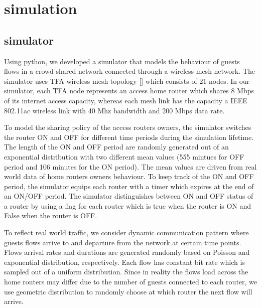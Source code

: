 \section{simulation}
\label{sec:simulation}

\subsection{simulator}
Using python, we developed a simulator that models the behaviour of guests flows in a crowd-shared network connected through a wireless mesh network. The simulator uses TFA wireless mesh topology [] which consists of 21 nodes. In our simulator, each TFA node represents an access home router which shares 8 Mbps of its internet access capacity, whereas each mesh link has the capacity a IEEE 802.11ac wireless link with 40 Mhz bandwidth and 200 Mbps data rate. 

To model the sharing policy of the access routers owners, the simulator switches the router ON and OFF for different time periods during the simulation lifetime. The length of the ON and OFF period are randomly generated out of an exponential distribution with two different mean values (555 mintues for OFF period and 106 minutes for the ON period). The mean values are driven from real world data of home routers owners behaviour. To keep track of the ON and OFF period, the simulator equips each router with a timer which expires at the end of an ON/OFF period. The simulator distinguishes between ON and OFF status of a router by using a flag for each router which is true when the router is ON and False when the router is OFF. 

To reflect real world traffic, we consider dynamic communication pattern where guests flows arrive to and departure from the network at certain time points. Flows arrival rates and durations are generated randomly based on Poisson and exponential distribution, respectively. Each flow has constant bit rate which is sampled out of a uniform distribution. Since in reality the flows load across the home routers may differ due to the number of guests connected to each router, we use geometric distribution to randomly choose at which router the next flow will arrive. 

